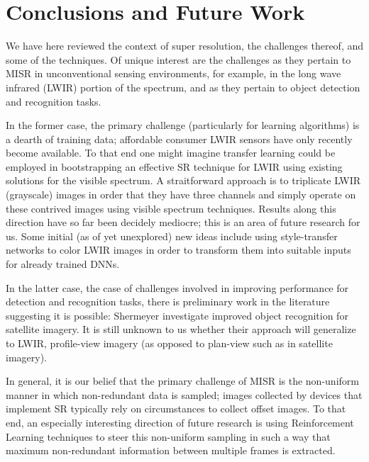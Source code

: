 \section{Conclusions and Future Work}\label{sec:conclusions}

We have here reviewed the context of super resolution, the challenges thereof, and some of the techniques.
%
Of unique interest are the challenges as they pertain to MISR in unconventional sensing environments, for example, in the long wave infrared (LWIR) portion of the spectrum, and as they pertain to object detection and recognition tasks.

In the former case, the primary challenge (particularly for learning algorithms) is a dearth of training data; affordable consumer LWIR sensors have only recently become available.
%
To that end one might imagine transfer learning could be employed in bootstrapping an effective SR technique for LWIR using existing solutions for the visible spectrum.
%
A straitforward approach is to triplicate LWIR (grayscale) images in order that they have three channels and simply operate on these contrived images using visible spectrum techniques.
%
Results along this direction have so far been decidely mediocre; this is an area of future research for us.
%
Some initial (as of yet unexplored) new ideas include using style-transfer networks to color LWIR images in order to transform them into suitable inputs for already trained DNNs.

In the latter case, the case of challenges involved in improving performance for detection and recognition tasks, there is preliminary work in the literature suggesting it is possible: Shermeyer \etal \cite{effectssuperres} investigate improved object recognition for satellite imagery. It is still unknown to us whether their approach will generalize to LWIR, profile-view imagery (as opposed to plan-view such as in satellite imagery).

In general, it is our belief that the primary challenge of MISR is the non-uniform manner in which non-redundant data is sampled; images collected by devices that implement SR typically rely on circumstances to collect offset images. To that end, an especially interesting direction of future research is using Reinforcement Learning techniques to steer this non-uniform sampling in such a way that maximum non-redundant information between multiple frames is extracted.